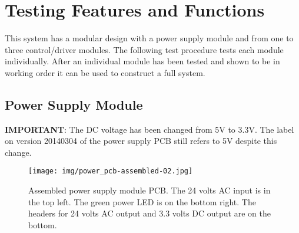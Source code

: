 \documentclass{article}
\begin{document}

\section{Testing Features and Functions}

This system has a modular design with a power supply module and from
one to three control/driver modules.
The following test procedure tests each module individually.
After an individual module has been tested and shown to be in working
order it can be used to construct a full system.

\subsection{Power Supply Module}

\begin{framed}
\textbf{IMPORTANT}: The DC voltage has been changed
from 5V to 3.3V.
The label on version 20140304 of the power supply PCB still
refers to 5V despite this change.
\end{framed}

\begin{figure}[hbp!]
\begin{center}
\texttt{[image: img/power\_pcb-assembled-02.jpg]}
\end{center}
\caption{Assembled power supply module PCB.
The 24 volts AC input is in the top left.
The green power LED is on the bottom right.
The headers for 24 volts AC output and 3.3 volts DC
output are on the bottom.
}\label{fig:psm2}
\end{figure}
\end{document}
